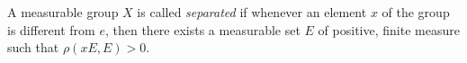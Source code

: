 A measurable group $X$ is called \emph{separated} if whenever an element $x$ of the group is different from $e$, then there exists a measurable set $E$ of positive, finite measure such that $\rho(xE, E) > 0$.